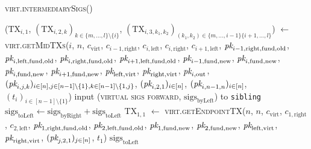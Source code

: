 \begin{center}
  \begin{processbox}{\textsc{virt.intermediarySigs}()}
    \begin{algorithmic}[1]
      \State ($\mathrm{TX}_{i, 1}$, $(\mathrm{TX}_{i, 2, k})_{k \in \{m, \dots,
      l\} \setminus \{i\}}$, $(\mathrm{TX}_{i, 3, k_1, k_2})_{(k_1, k_2) \in
      \{m, \dots, i-1\} \{i+1, \dots, l\}}$) $\gets$
      \textsc{virt.getMidTXs}($i$, $n$, $c_{\mathrm{virt}}$, $c_{i-1,
      \mathrm{right}}$, $c_{i, \mathrm{left}}$, $c_{i, \mathrm{right}}$,
      $c_{i+1, \mathrm{left}}$, $\textit{pk}_{i-1, \mathrm{right}, \mathrm{fund},
      \mathrm{old}}$, $\textit{pk}_{i, \mathrm{left}, \mathrm{fund}, \mathrm{old}}$,
      $\textit{pk}_{i, \mathrm{right}, \mathrm{fund}, \mathrm{old}}$, $\textit{pk}_{i+1,
      \mathrm{left}, \mathrm{fund}, \mathrm{old}}$, $\textit{pk}_{i-1, \mathrm{fund},
      \mathrm{new}}$, $\textit{pk}_{i, \mathrm{fund}, \mathrm{new}}$, $\textit{pk}_{i,
      \mathrm{fund}, \mathrm{new}}$, $\textit{pk}_{i+1, \mathrm{fund}, \mathrm{new}}$,
      $\textit{pk}_{\mathrm{left}, \mathrm{virt}}$, $\textit{pk}_{\mathrm{right}, \mathrm{virt}}$,
      $\textit{pk}_{i, \mathrm{out}}$, $(\textit{pk}_{i,j,k})_{i \in [n], j \in [n-1] \setminus
      \{1\}, k \in [n-1] \setminus \{1, j\}}$, $(\textit{pk}_{i, 2, 1})_{i \in [n]}$,
      $(\textit{pk}_{i, n-1, n})_{i \in [n]}$, $(t_i)_{i \in [n-1] \setminus \{1\}}$)
      \State {}
      \State input (\textsc{virtual sigs forward},
      $\mathrm{sigs}_{\mathrm{byLeft}}$) to \texttt{sibling}
      \State {}
      \State $\mathrm{sigs}_{\mathrm{toLeft}} \gets
      \mathrm{sigs}_{\mathrm{byRight}} + \mathrm{sigs}_{\mathrm{toLeft}}$
       
        \State $\mathrm{TX}_{1, 1}$ $\gets$ \textsc{virt.getEndpointTX}($n$,
        $n$, $c_{\mathrm{virt}}$, $c_{1, \mathrm{right}}$, $c_{2,
        \mathrm{left}}$, $\textit{pk}_{1, \mathrm{right}, \mathrm{fund}, \mathrm{old}}$,
        $\textit{pk}_{2, \mathrm{left}, \mathrm{fund}, \mathrm{old}}$, $\textit{pk}_{1,
        \mathrm{fund}, \mathrm{new}}$, $\textit{pk}_{2, \mathrm{fund}, \mathrm{new}}$,
        $\textit{pk}_{\mathrm{left}, \mathrm{virt}}$, $\textit{pk}_{\mathrm{right},
        \mathrm{virt}}$, $(\textit{pk}_{j, 2, 1})_{j \in [n]}$, $t_1$)
      \EndIf
      \State \Return $\mathrm{sigs}_{\mathrm{toLeft}}$
    \end{algorithmic}
  \end{processbox}
  \label{code:virtual-layer:intermediary-sigs}
\end{center} \ \\


